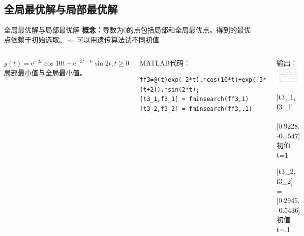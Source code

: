 \documentclass[12pt]{beamer}
\begin{document}
	\subsection{全局最优解与局部最优解}
\begin{frame}[fragile]{全局最优解与局部最优解}
	\textbf{概念：}导数为0的点包括局部和全局最优点。得到的最优点依赖于初始选取。$\Leftarrow$可以用遗传算法试不同初值
	
	\begin{columns}[T]
		
	\begin{example}[6-13]
		$y(t)=\mathrm{e}^{-2 t} \cos 10 t+\mathrm{e}^{-3 t-6} \sin 2 t, t \geqslant 0$局部最小值与全局最小值。
	\end{example}
	
	\begin{block}{MATLAB代码：}
\begin{lstlisting}
ff3=@(t)exp(-2*t).*cos(10*t)+exp(-3*(t+2)).*sin(2*t);
[t3_1,f3_1] = fminsearch(ff3,1)
[t3_2,f3_2] = fminsearch(ff3,.1)
\end{lstlisting}
	\end{block}	
	
		
		\begin{block}{输出：}
	\centering
	\includegraphics[width=.8\textwidth]{23}
			
	[t3\_1, f3\_1] =[0.9228, -0.1547] 初值t=1
	
	[t3\_2, f3\_2] =[0.2945, -0.5436] 初值t=.1
		\end{block}
		
	\end{columns}
\end{frame}
\end{document}
